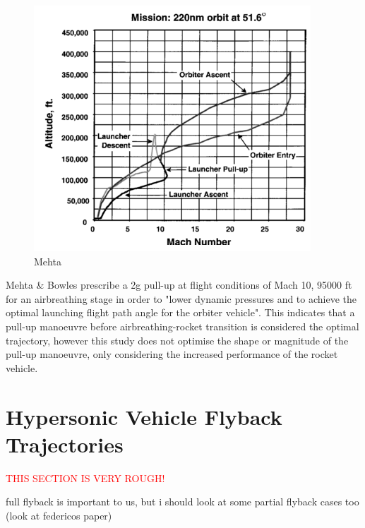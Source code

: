 \begin{figure}
\begin{minipage}[b]{0.3\textwidth}
		\caption{}
		\label{fig:WilhiteBoosterVehicle}
	\end{minipage}	
	\begin{minipage}[b]{0.6\textwidth}
		\includegraphics[width=\linewidth]{"figures/2_literature-review/Mehta Trajectory"}
		\caption{Mehta}
		\label{fig:WilHiteBoosterTrajectory}
	\end{minipage}
	
\end{figure}
Mehta \& Bowles \cite{Mehta2001} prescribe a 2g pull-up at flight conditions of Mach 10, 95000 ft for an airbreathing stage in order to "lower dynamic pressures and to achieve the optimal launching flight path angle for the orbiter vehicle". This indicates that a pull-up manoeuvre before airbreathing-rocket transition is considered the optimal trajectory, however this study does not optimise the shape or magnitude of the pull-up manoeuvre, only considering the increased performance of the rocket vehicle. 



\section{Hypersonic Vehicle Flyback Trajectories}

  \textcolor{red}{THIS SECTION IS VERY ROUGH!}
  
full flyback is important to us, but i should look at some partial flyback cases too (look at federicos paper)


